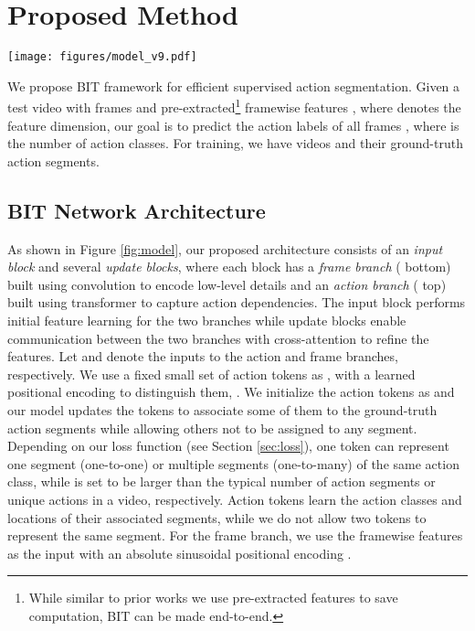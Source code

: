 \documentclass[10pt,twocolumn,letterpaper]{article}
\newcommand{\0}{\boldsymbol{0}}
\begin{document}
\section{Proposed Method}

\begin{figure*}
\texttt{[image: figures/model\_v9.pdf]}
   \caption{\small Our BIT network that learns explicit action tokens to represent action segments, performs temporal modeling on action and frame levels in parallel while maintaining low computation cost.}
   \label{fig:model}
\end{figure*}

We propose BIT framework for efficient supervised action segmentation. Given a test video with  frames and pre-extracted\footnote{While similar to prior works we use pre-extracted features to save computation, BIT can be made end-to-end.} framewise features , where  denotes the feature dimension, our goal is to predict the action labels of all frames , where  is the number of action classes. For training, we have videos and their ground-truth action segments. 


\subsection{BIT Network Architecture}

\label{sec:model}
As shown in Figure \ref{fig:model}, our proposed architecture consists of an \emph{input block} and several \emph{update blocks}, where each block has a \emph{frame branch} ({\color{blue} bottom}) built using convolution to encode low-level details and an \emph{action branch} ({\color{green} top}) built using transformer to capture action dependencies. The input block performs initial feature learning for the two branches while update blocks enable communication between the two branches with cross-attention to refine the features.
Let  and  denote the inputs to the action and frame branches, respectively. 
We use a fixed small set of  action tokens as , with a learned positional encoding  to distinguish them, . 
We initialize the action tokens as  and our model updates the tokens to associate some of them to the ground-truth action segments while allowing others not to be assigned to any segment.
Depending on our loss function (see Section \ref{sec:loss}), one token can represent one segment (one-to-one) or multiple segments (one-to-many) of the same action class, while  is set to be larger than the typical number of action segments or unique actions in a video, respectively. 
Action tokens learn the action classes and locations of their associated segments, while we do not allow two tokens to represent the same segment. 
For the frame branch, we use the framewise features  as the input with an absolute sinusoidal positional encoding . 
\end{document}
